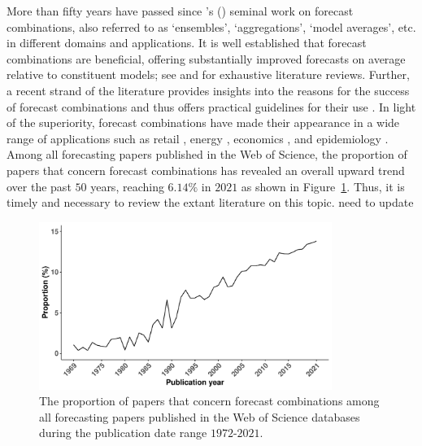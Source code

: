 \documentclass[11pt]{article}
\def\citeapos#1{\citeauthor{#1}'s (\citeyear{#1})}
\begin{document}
More than fifty years have passed since \citeapos{Bates1969-yj} seminal work on forecast combinations, also referred to as `ensembles', `aggregations', `model averages', etc. in different domains and applications. It is well established that forecast combinations are beneficial, offering substantially improved forecasts on average relative to constituent models; see \cite{Clemen1989-fb} and \cite{Timmermann2006-en} for exhaustive literature reviews. Further, a recent strand of the literature provides insights into the reasons for the success of forecast combinations and thus offers practical guidelines for their use \citep{Palm1992-im,De_Menezes2000-vd,Chan2018-jl,Atiya2020-ge,Lichtendahl2020-ut}. In light of the superiority, forecast combinations have made their appearance in a wide range of applications such as retail \citep{Ma2021-np}, energy \citep{Xie2016-fb}, economics \citep{Aastveit2018-lf}, and epidemiology \citep{Brooks2020-sg}. Among all forecasting papers published in the Web of Science, the proportion of papers that concern forecast combinations has revealed an overall upward trend over the past $50$ years, reaching $6.14\%$ in $2021$ as shown in Figure~\ref{fig:prop}. Thus, it is timely and necessary to review the extant literature on this topic. {\color{red} need to update}

\begin{figure}
  \centering \includegraphics[width=0.85\textwidth]{prop}
  \caption{The proportion of papers that concern forecast combinations among all forecasting papers published in the Web of Science databases during the publication date range $1972$-$2021$.}
  \label{fig:prop}
\end{figure}
\end{document}

